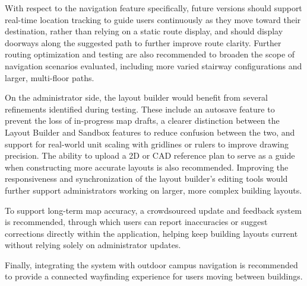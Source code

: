 With respect to the navigation feature specifically, future versions should
support real-time location tracking to guide users continuously as they move
toward their destination, rather than relying on a static route display, and
should display doorways along the suggested path to further improve route
clarity. Further routing optimization and testing are also recommended to
broaden the scope of navigation scenarios evaluated, including more varied
stairway configurations and larger, multi-floor paths.

On the administrator side, the layout builder would benefit from several
refinements identified during testing. These include an autosave feature to
prevent the loss of in-progress map drafts, a clearer distinction between the
Layout Builder and Sandbox features to reduce confusion between the two, and
support for real-world unit scaling with gridlines or rulers to improve drawing
precision. The ability to upload a 2D or CAD reference plan to serve as a guide
when constructing more accurate layouts is also recommended. Improving the
responsiveness and synchronization of the layout builder's editing tools would
further support administrators working on larger, more complex building layouts.

To support long-term map accuracy, a crowdsourced update and feedback system is
recommended, through which users can report inaccuracies or suggest corrections
directly within the application, helping keep building layouts current without
relying solely on administrator updates.

Finally, integrating the system with outdoor campus navigation is recommended to
provide a connected wayfinding experience for users moving between buildings.

